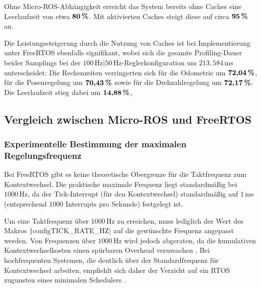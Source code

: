 Ohne Micro-ROS-Abhängigkeit erreicht das System bereits ohne Caches eine
Leerlaufzeit von etwa $\textbf{80\,\%}$. Mit aktivierten Caches steigt diese auf
circa $\textbf{95\,\%}$ an.

Die Leistungssteigerung durch die Nutzung von Caches ist bei Implementierung
unter FreeRTOS ebenfalls signifikant, wobei sich die gesamte Profiling-Dauer
beider Samplings bei der $100\,\text{Hz}|50\,\text{Hz}$-Reglerkonfiguration um
$213,584\,\text{ms}$ unterscheidet: Die Rechenzeiten verringerten sich für die
Odometrie um $\textbf{72,04\,\%}$, für die Posenregelung um $\textbf{70,43\,\%}$
sowie für die Drehzahlregelung um $\textbf{72,17\,\%}$. Die Leerlaufzeit stieg
dabei um $\textbf{14,88\,\%}$, 

\subsection{Vergleich zwischen Micro-ROS und FreeRTOS}

\subsubsection{Experimentelle Bestimmung der maximalen Regelungsfrequenz}

Bei FreeRTOS gibt es keine theoretische Obergrenze für die Taktfrequenz zum
Kontextwechsel. Die praktische maximale Frequenz liegt standardmäßig bei
$1000\,\text{Hz}$, da der Tick-Interrupt (für den Kontextwechsel) standardmäßig
auf $1\,\text{ms}$ (entsprechend $1000$ Interrupts pro Sekunde) festgelegt ist.

Um eine Taktfrequenz über $1000\,\text{Hz}$ zu erreichen, muss lediglich der
Wert des Makros \texttt|configTICK_RATE_HZ| auf die gewünschte Frequenz
angepasst werden. Von Frequenzen über $1000\,\text{Hz}$ wird jedoch abgeraten,
da die kumulativen Kontextwechselkosten einen spürbaren Overhead verursachen
\cite{FreertosTickRate2010}. Bei hochfrequenten Systemen, die deutlich über der
Standardfrequenz für Kontextwechsel arbeiten, empfiehlt sich daher der Verzicht
auf ein RTOS zugunsten eines minimalen Schedulers \cite{FreertosForumHF2019}.

